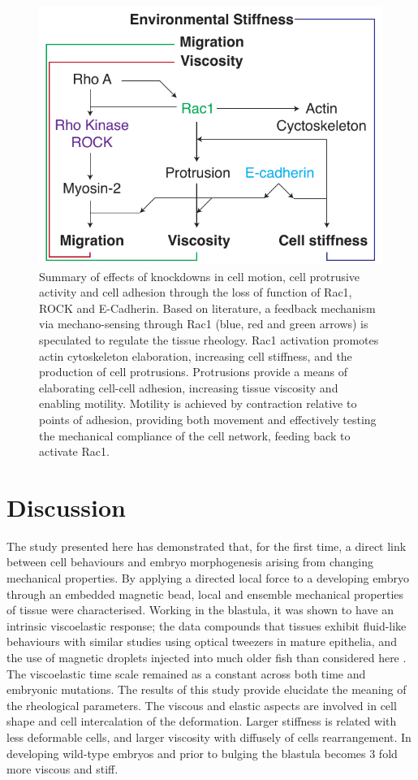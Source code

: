 \begin{figure}
  \centering
  \includegraphics{Chapters/tweezers/Figs/PDF/interconnected_protein_signalling}
  \caption{Summary of effects of knockdowns in cell motion, cell protrusive activity and cell adhesion through the loss of function of Rac1, ROCK and E-Cadherin.
  Based on literature, a feedback mechanism via mechano-sensing through Rac1 (blue, red and green arrows) is speculated to regulate the tissue rheology.
  Rac1 activation promotes actin cytoskeleton elaboration, increasing cell stiffness, and the production of cell protrusions.
  Protrusions provide a means of elaborating cell-cell adhesion, increasing tissue viscosity and enabling motility.
  Motility is achieved by contraction relative to points of adhesion, providing both movement and effectively testing the mechanical compliance of the cell network, feeding back to activate Rac1.
  }
  \label{fig:interconnected_protein_signalling}
\end{figure}

\section{Discussion}

The study presented here has demonstrated that, for the first time, a direct link between cell behaviours and embryo morphogenesis arising from changing mechanical properties.
By applying a directed local force to a developing embryo through an embedded magnetic bead, local and ensemble mechanical properties of tissue were characterised.
Working in the blastula, it was shown to have an intrinsic viscoelastic response; the data compounds that tissues exhibit fluid-like behaviours with similar studies using optical tweezers in mature epithelia, \cite{19} and the use of magnetic droplets injected into much older fish than considered here \cite{18}.
The viscoelastic time scale remained as a constant across both time and embryonic mutations.
The results of this study provide elucidate the meaning of the rheological parameters.
The viscous and elastic aspects are involved in cell shape and cell intercalation of the deformation.
Larger stiffness is related with less deformable cells, and larger viscosity with diffusely of cells rearrangement.
In developing wild-type embryos and prior to bulging the blastula becomes 3 fold more viscous and stiff.

